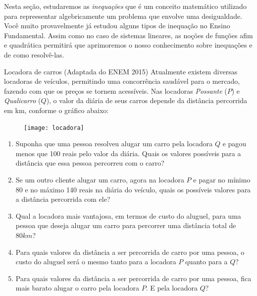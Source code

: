 Nesta seção, estudaremos as \emph{inequações} que é um conceito matemático utilizado para repreesentar algebricamente um problema que envolve uma desigualdade. Você muito provavelmente já estudou alguns tipos de inequação no Ensino Fundamental. Assim como no caso de sistemas lineares, as noções de funções afim e quadrática permitirá que aprimoremos o nosso conhecimento sobre inequações e de como resolvê-las. 


\begin{task}{Locadora de carros (Adaptada do ENEM 2015)}
\label{locadora}
Atualmente existem diversas locadoras de veículos, permitindo uma concorrência saudável para o mercado, fazendo com que os preços se tornem acessíveis. Nas locadoras \emph{Possante} ($P$) e \emph{Qualicarro} ($Q$), o valor da diária de seus carros depende da distância percorrida em km, conforme o gráfico abaixo:

\begin{figure}[H]
\centering
\noindent\texttt{[image: locadora]}
\end{figure}


\begin{enumerate}

\item{}
Suponha que uma pessoa resolveu alugar um carro pela locadora $Q$ e pagou menos que 100 reais pelo valor da diária. Quais os valores possíveis para a distância que essa pessoa percorreu com o carro?

\item{}
Se um outro cliente alugar um carro, agora na locadora $P$ e pagar no mínimo 80 e no máximo 140 reais na diária do veículo, quais os possíveis valores para a distância percorrida com ele?

\item{}
Qual a locadora mais vantajosa, em termos de custo do aluguel, para uma pessoa que deseja alugar um carro para percorrer uma distância total de $80 km$?

\item{} Para quais valores da distância a ser percorrida de carro por uma pessoa, o custo do aluguel será o mesmo tanto para a locadora $P$ quanto para a $Q$?

\item{} Para quais valores da distância a ser percorrida de carro por uma pessoa, fica mais barato alugar o carro pela locadora $P$. E pela locadora $Q$? 

\end{enumerate}
\end{task}



